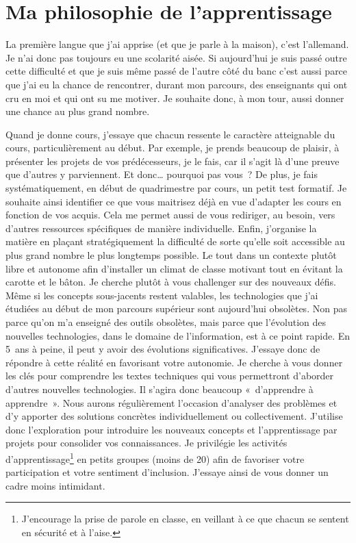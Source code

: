 \clearpage
\section{Ma philosophie de l'apprentissage}

La première langue que j'ai apprise (et que je parle à la maison), c'est l'allemand. Je n'ai donc pas toujours eu une scolarité aisée. Si aujourd'hui je suis passé outre cette difficulté et que je suis même passé de l'autre côté du banc c'est aussi parce que j'ai eu la chance de rencontrer, durant mon parcours, des enseignants qui ont cru en moi et qui ont su me motiver. Je souhaite donc, à mon tour, aussi donner une chance au plus grand nombre.

Quand je donne cours, j’essaye que chacun ressente le caractère atteignable du cours, particulièrement au début. Par exemple, je prends beaucoup de plaisir, à présenter les projets de vos prédécesseurs, je le fais, car il s’agit là d’une preuve que d’autres y parviennent. Et donc… pourquoi pas vous~? De plus, je fais systématiquement, en début de quadrimestre par cours, un petit test formatif. Je souhaite ainsi identifier ce que vous maitrisez déjà en vue d’adapter les cours en fonction de vos acquis. Cela me permet aussi de vous rediriger, au besoin, vers d'autres ressources spécifiques de manière individuelle. Enfin, j'organise la matière en plaçant stratégiquement la difficulté de sorte qu'elle soit accessible au plus grand nombre le plus longtemps possible. Le tout dans un contexte plutôt libre et autonome afin d'installer un climat de classe motivant tout en évitant la carotte et le bâton. Je cherche plutôt à vous challenger sur des nouveaux défis.
\\

Même si les concepts sous-jacents restent valables, les technologies que j'ai étudiées au début de mon parcours supérieur sont aujourd'hui obsolètes. Non pas parce qu'on m'a enseigné des outils obsolètes, mais parce que l'évolution des nouvelles technologies, dans le domaine de l'information, est à ce point rapide. En 5~ans à peine, il peut y avoir des évolutions significatives. J’essaye donc de répondre à cette réalité en favorisant votre autonomie. Je cherche à vous donner les clés pour comprendre les textes techniques qui vous permettront d’aborder d’autres nouvelles technologies. Il s’agira donc beaucoup «~d’apprendre à apprendre~». Nous aurons régulièrement l’occasion d’analyser des problèmes et d’y apporter des solutions concrètes individuellement ou collectivement. J’utilise donc l'exploration pour introduire les nouveaux concepts et l’apprentissage par projets pour consolider vos connaissances. Je privilégie les activités d’apprentissage\footnote{J'encourage la prise de parole en classe, en veillant à ce que chacun se sentent en sécurité et à l'aise.} en petits groupes (moins de 20) afin de favoriser votre participation et votre sentiment d’inclusion. J’essaye ainsi de vous donner un cadre moins intimidant.


